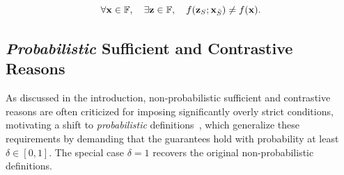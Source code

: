 \documentclass{article}
\newcommand{\z}{\textbf{z}}
\newcommand{\x}{\textbf{x}}
\begin{document}
\begin{equation}
    \forall \x\in\mathbb{F}, \quad \exists \z\in\mathbb{F}, \quad f(\z_S;\x_{\Bar{S}})\neq f(\x).
\end{equation}

\subsection{\emph{Probabilistic} Sufficient and Contrastive Reasons}

As discussed in the introduction, non-probabilistic sufficient and contrastive reasons are often criticized for imposing significantly overly strict conditions, motivating a shift to \emph{probabilistic} definitions~\citep{arenas2022computing, ribeiro2018anchors, izza2023computing, waldchen2021computational, bounia2023approximating, subercaseaux2024probabilistic, wang2021probabilistic, blanc2021provably}, which generalize these requirements by demanding that the guarantees hold with probability at least $\delta \in [0,1]$. The special case $\delta=1$ recovers the original non-probabilistic definitions.

\end{document}
